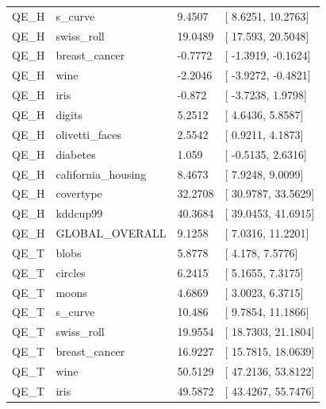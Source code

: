 \documentclass[
]{article}
\providecommand{\DIFadd}[1]{{\protect\color{blue} #1}} %
\begin{document}
{\begin{longtable}[]{@{}llll@{}}
\DIFadd{QE\_H }& \DIFadd{s\_curve }& \DIFadd{9.4507 }& {[}\DIFadd{8.6251, 10.2763}{]} \\
\DIFadd{QE\_H }& \DIFadd{swiss\_roll }& \DIFadd{19.0489 }& {[}\DIFadd{17.593, 20.5048}{]} \\
\DIFadd{QE\_H }& \DIFadd{breast\_cancer }& \DIFadd{-0.7772 }& {[}\DIFadd{-1.3919, -0.1624}{]} \\
\DIFadd{QE\_H }& \DIFadd{wine }& \DIFadd{-2.2046 }& {[}\DIFadd{-3.9272, -0.4821}{]} \\
\DIFadd{QE\_H }& \DIFadd{iris }& \DIFadd{-0.872 }& {[}\DIFadd{-3.7238, 1.9798}{]} \\
\DIFadd{QE\_H }& \DIFadd{digits }& \DIFadd{5.2512 }& {[}\DIFadd{4.6436, 5.8587}{]} \\
\DIFadd{QE\_H }& \DIFadd{olivetti\_faces }& \DIFadd{2.5542 }& {[}\DIFadd{0.9211, 4.1873}{]} \\
\DIFadd{QE\_H }& \DIFadd{diabetes }& \DIFadd{1.059 }& {[}\DIFadd{-0.5135, 2.6316}{]} \\
\DIFadd{QE\_H }& \DIFadd{california\_housing }& \DIFadd{8.4673 }& {[}\DIFadd{7.9248, 9.0099}{]} \\
\DIFadd{QE\_H }& \DIFadd{covertype }& \DIFadd{32.2708 }& {[}\DIFadd{30.9787, 33.5629}{]} \\
\DIFadd{QE\_H }& \DIFadd{kddcup99 }& \DIFadd{40.3684 }& {[}\DIFadd{39.0453, 41.6915}{]} \\
\DIFadd{QE\_H }& \DIFadd{GLOBAL\_OVERALL }& \DIFadd{9.1258 }& {[}\DIFadd{7.0316, 11.2201}{]} \\
\DIFadd{QE\_T }& \DIFadd{blobs }& \DIFadd{5.8778 }& {[}\DIFadd{4.178, 7.5776}{]} \\
\DIFadd{QE\_T }& \DIFadd{circles }& \DIFadd{6.2415 }& {[}\DIFadd{5.1655, 7.3175}{]} \\
\DIFadd{QE\_T }& \DIFadd{moons }& \DIFadd{4.6869 }& {[}\DIFadd{3.0023, 6.3715}{]} \\
\DIFadd{QE\_T }& \DIFadd{s\_curve }& \DIFadd{10.486 }& {[}\DIFadd{9.7854, 11.1866}{]} \\
\DIFadd{QE\_T }& \DIFadd{swiss\_roll }& \DIFadd{19.9554 }& {[}\DIFadd{18.7303, 21.1804}{]} \\
\DIFadd{QE\_T }& \DIFadd{breast\_cancer }& \DIFadd{16.9227 }& {[}\DIFadd{15.7815, 18.0639}{]} \\
\DIFadd{QE\_T }& \DIFadd{wine }& \DIFadd{50.5129 }& {[}\DIFadd{47.2136, 53.8122}{]} \\
\DIFadd{QE\_T }& \DIFadd{iris }& \DIFadd{49.5872 }& {[}\DIFadd{43.4267, 55.7476}{]} \\

\end{longtable}}
\end{document}
